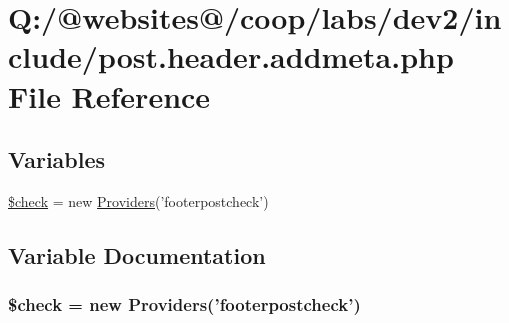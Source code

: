 \hypertarget{post_8header_8addmeta_8php}{\section{Q\-:/@websites@/coop/labs/dev2/include/post.header.\-addmeta.\-php File Reference}
\label{post_8header_8addmeta_8php}
}
\subsection*{Variables}
\begin{DoxyCompactItemize}
\item 
\hyperlink{post_8header_8addmeta_8php_a830cf70d25fefacddcf4c6bc3fd7a0e0}{\$check} = new \hyperlink{class_providers}{Providers}('footerpostcheck')
\end{DoxyCompactItemize}


\subsection{Variable Documentation}
\hypertarget{post_8header_8addmeta_8php_a830cf70d25fefacddcf4c6bc3fd7a0e0}{
\subsubsection[{\$check}]{\setlength{\rightskip}{0pt plus 5cm}\$check = new {\bf Providers}('footerpostcheck')}}\label{post_8header_8addmeta_8php_a830cf70d25fefacddcf4c6bc3fd7a0e0}
